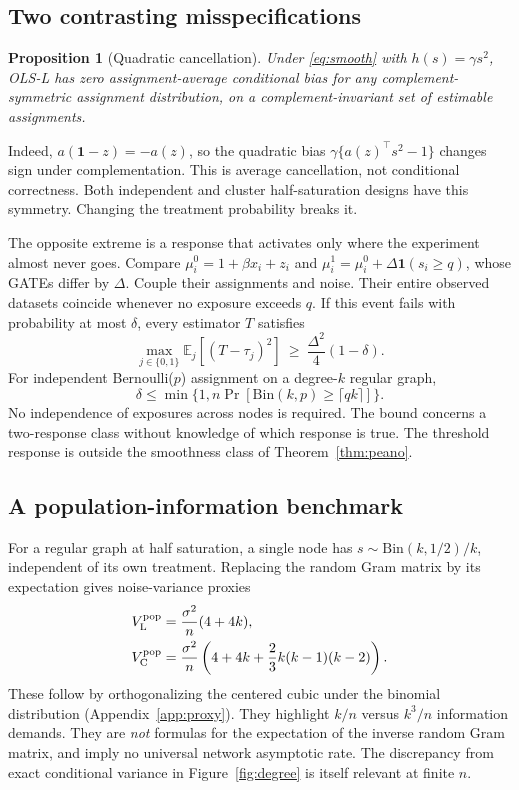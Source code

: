 \documentclass{article}
\newtheorem{proposition}{Proposition}
\newcommand{\E}{\mathbb E}
\newcommand{\one}{\mathbf 1}
\begin{document}
\subsection{Two contrasting misspecifications}
\begin{proposition}[Quadratic cancellation]
\label{prop:symmetry}
Under \eqref{eq:smooth} with $h(s)=\gamma s^2$, OLS-L has zero assignment-average conditional bias for any complement-symmetric assignment distribution, on a complement-invariant set of estimable assignments.
\end{proposition}
Indeed, $a(\one-z)=-a(z)$, so the quadratic bias $\gamma\{a(z)^\top s^2-1\}$ changes sign under complementation. This is average cancellation, not conditional correctness. Both independent and cluster half-saturation designs have this symmetry. Changing the treatment probability breaks it.

The opposite extreme is a response that activates only where the experiment almost never goes. Compare $\mu_i^0=1+\beta x_i+z_i$ and $\mu_i^1=\mu_i^0+\Delta\one(s_i\ge q)$, whose GATEs differ by $\Delta$. Couple their assignments and noise. Their entire observed datasets coincide whenever no exposure exceeds $q$. If this event fails with probability at most $\delta$, every estimator $T$ satisfies
\begin{equation}
\max_{j\in\{0,1\}}\E_j[(T-\tau_j)^2]
\ \ge\ \frac{\Delta^2}{4}(1-\delta).
\label{eq:lower}
\end{equation}
For independent Bernoulli($p$) assignment on a degree-$k$ regular graph,
\begin{equation}
\delta\le \min\{1,n\Pr[\mathrm{Bin}(k,p)\ge\lceil qk\rceil]\}.
\end{equation}
No independence of exposures across nodes is required. The bound concerns a two-response class without knowledge of which response is true. The threshold response is outside the smoothness class of Theorem~\ref{thm:peano}.

\subsection{A population-information benchmark}
For a regular graph at half saturation, a single node has $s\sim\mathrm{Bin}(k,1/2)/k$, independent of its own treatment. Replacing the random Gram matrix by its expectation gives noise-variance proxies
\begin{align}
V_{\rm L}^{\rm pop}&=\frac{\sigma^2}{n}(4+4k),\nonumber\\
V_{\rm C}^{\rm pop}&=\frac{\sigma^2}{n}\left(4+4k+\frac23 k(k-1)(k-2)\right).
\label{eq:proxy}
\end{align}
These follow by orthogonalizing the centered cubic under the binomial distribution (Appendix~\ref{app:proxy}). They highlight $k/n$ versus $k^3/n$ information demands. They are \emph{not} formulas for the expectation of the inverse random Gram matrix, and imply no universal network asymptotic rate. The discrepancy from exact conditional variance in Figure~\ref{fig:degree} is itself relevant at finite $n$.
\end{document}
